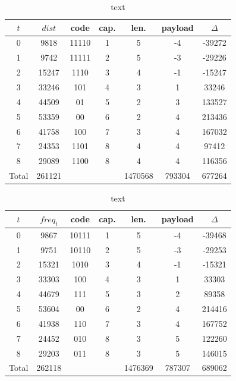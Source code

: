 \begin{table}
	\centering
	\caption{text}
	
	\begin{tabular}{ccccccc}
		\toprule 
		$t$ &   $dist$ &     code &     cap. &     len. &  payload & $\Delta$ \\ 
		\midrule 
		0 &     9818 & 11110    &        1 &        5 &       -4 &   -39272  \\ 
		1 &     9742 & 11111    &        2 &        5 &       -3 &   -29226  \\ 
		2 &    15247 & 1110     &        3 &        4 &       -1 &   -15247  \\ 
		3 &    33246 & 101      &        4 &        3 &        1 &    33246  \\ 
		4 &    44509 & 01       &        5 &        2 &        3 &   133527  \\ 
		5 &    53359 & 00       &        6 &        2 &        4 &   213436  \\ 
		6 &    41758 & 100      &        7 &        3 &        4 &   167032  \\ 
		7 &    24353 & 1101     &        8 &        4 &        4 &    97412  \\ 
		8 &    29089 & 1100     &        8 &        4 &        4 &   116356  \\ 
		\midrule 
		Total &   261121 & & &  1470568 &   793304 &   677264 \\ 
		\bottomrule   
	\end{tabular}


	\begin{tabular}{ccccccc}
		\toprule 
		$t$ & $freq_t$ &     code &     cap. &     len. &  payload & $\Delta$ \\ 
		\midrule 
		0 &     9867 & 10111    &        1 &        5 &       -4 &   -39468 \\ 
		1 &     9751 & 10110    &        2 &        5 &       -3 &   -29253 \\ 
		2 &    15321 & 1010     &        3 &        4 &       -1 &   -15321 \\ 
		3 &    33303 & 100      &        4 &        3 &        1 &    33303 \\ 
		4 &    44679 & 111      &        5 &        3 &        2 &    89358 \\ 
		5 &    53604 & 00       &        6 &        2 &        4 &   214416 \\ 
		6 &    41938 & 110      &        7 &        3 &        4 &   167752 \\ 
		7 &    24452 & 010      &        8 &        3 &        5 &   122260 \\ 
		8 &    29203 & 011      &        8 &        3 &        5 &   146015 \\ 
		\midrule 
		Total &   262118 & & &  1476369 &   787307 &   689062 \\ 
		\bottomrule 
	\end{tabular}
\end{table}

